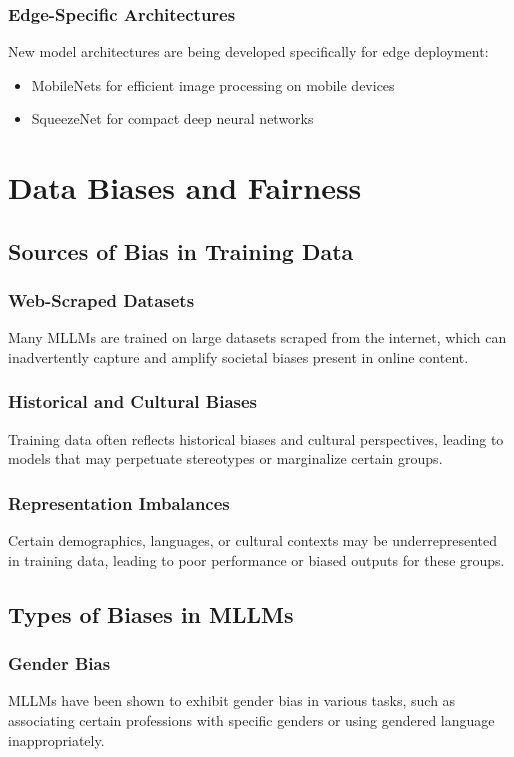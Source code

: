 \subsubsection{Edge-Specific Architectures}
New model architectures are being developed specifically for edge deployment:
\begin{itemize}
    \item MobileNets for efficient image processing on mobile devices
    \item SqueezeNet for compact deep neural networks
\end{itemize}

\section{Data Biases and Fairness}

\subsection{Sources of Bias in Training Data}
\subsubsection{Web-Scraped Datasets}
Many MLLMs are trained on large datasets scraped from the internet, which can inadvertently capture and amplify societal biases present in online content.

\subsubsection{Historical and Cultural Biases}
Training data often reflects historical biases and cultural perspectives, leading to models that may perpetuate stereotypes or marginalize certain groups.

\subsubsection{Representation Imbalances}
Certain demographics, languages, or cultural contexts may be underrepresented in training data, leading to poor performance or biased outputs for these groups.

\subsection{Types of Biases in MLLMs}
\subsubsection{Gender Bias}
MLLMs have been shown to exhibit gender bias in various tasks, such as associating certain professions with specific genders or using gendered language inappropriately.

